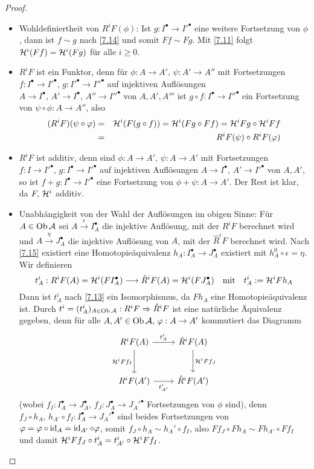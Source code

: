 \begin{proof}
	\begin{itemize}
		\item Wohldefiniertheit von $R^iF(\phi)$: Ist $g:I^\bullet\to I'^\bullet$ eine weitere Fortsetzung von $\phi$, dann ist $f \sim g$ nach \ref{7.14} und somit $Ff\sim Fg$. Mit \ref{7.11} folgt $\mathcal{H}^i(Ff) = \mathcal{H}^i(Fg)$ für alle $i\geq 0$.
		\item $R^iF$ ist ein Funktor, denn für $\phi:A \to A', \, \psi:A' \to A''$ mit Fortsetzungen $f:I^\bullet\to I'^\bullet, \, g:I'^\bullet \to I''^\bullet$ auf injektiven Auflösungen $A\to I^\bullet, \, A'\to I^\bullet, \, A'' \to I''^\bullet$ von $A,A',A'''$ ist $g\circ f:I^\bullet\to I''^\bullet$ ein Fortsetzung von $\psi \circ \phi:A \to A''$, also 
		\begin{eqnarray*}
			(R^iF)(\psi \circ \varphi) &=& \mathcal{H}^i(F(g\circ f)) = \mathcal{H}^i(Fg\circ Ff) = \mathcal{H}^iFg \circ \mathcal{H}^iFf\\
			& =& R^iF(\psi) \circ R^iF(\varphi)
		\end{eqnarray*}
		\item $R^iF$ ist additiv, denn sind $\phi:A\to A', \, \psi :A \to A'$ mit Fortsetzungen $f:I \to I'^\bullet, \, g:I^\bullet\to I'^\bullet$ auf injektiven Auflösungen $A\to I^\bullet, \, A' \to I'^\bullet$ von $A, A'$, so ist $f+g :I^\bullet\to I'^\bullet$ eine Fortsetzung von $\phi + \psi:A\to A'$. Der Rest ist klar, da $F, \,\mathcal{H}^i$ additiv.
		\item Unabhängigkeit von der Wahl der Auflösungen im obigen Sinne: Für $A\in \text{Ob}\,\mathcal{A}$ sei $A\xrightarrow{\epsilon} I_A^\bullet$ die injektive Auflösung, mit der $R^iF$ berechnet wird und $A\xrightarrow{\eta} J_A^\bullet$ die injektive Auflösung von $A$, mit der $\hat R^i F$ berechnet wird. Nach \ref{7.15} existiert eine Homotopieäquivalenz $h_A:I_A^\bullet\to J_A^\bullet$ existiert mit $h_A^0 \circ \epsilon = \eta$. Wir definieren
		$$t_A^i:R^iF(A) = \mathcal{H}^i(FI_A^\bullet)\longrightarrow \hat R^iF(A) = \mathcal{H}^i(FJ_A^\bullet) \quad \text{mit} \quad t_A^i:= \mathcal{H}^iFh_A$$
		Dann ist $t^i_A$ nach \ref{7.13} ein Isomorphismus, da $Fh_A$ eine Homotopieäquivalenz ist. Durch $t^i=(t_A^i)_{A\in \text{Ob}\,\mathcal{A}}:R^iF\Rightarrow \hat R^iF$ ist eine natürliche Äquivalenz gegeben, denn für alle $A,A'\in \text{Ob}\,\mathcal{A}, \, \varphi:A \to A'$ kommutiert das Diagramm
		$$\begin{tikzcd}[row sep = large]
		R^iF(A) \arrow{r}{t_A^i} \arrow[swap]{d}{\HH^iFf_I} & \hat R^iF(A) \arrow{d}{\HH^iFf_J}\\
		R^iF(A') \arrow[swap]{r}{t^i_{A'}} & \hat R^iF(A')
		\end{tikzcd}$$
		(wobei $f_I:I_A^\bullet\to J_A^\bullet, \, f_J:J_A^\bullet \to J_A'^\bullet$ Fortsetzungen von $\phi$ sind), denn $f_J \circ h_A, \, h_{A'} \circ f_I: I_A^\bullet \to J_A'^{\bullet}$ sind beides Fortsetzungen von $\varphi=\varphi \circ \operatorname{id}_A = \operatorname{id}_{A'} \circ \varphi$, somit $f_J \circ h_A \sim h_A' \circ f_I$, also $Ff_J \circ Fh_A \sim Fh_{A'} \circ Ff_I$ und damit $\mathcal{H}^iFf_J \circ t^i_A = t^i_{A'} \circ \mathcal{H}^iFf_I$.
	\end{itemize}
\end{proof}
